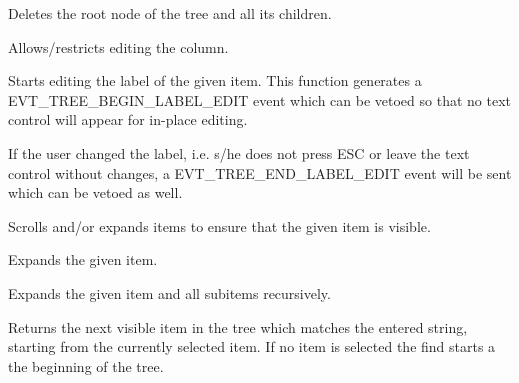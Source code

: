 
Deletes the root node of the tree and all its children.

\label{wxtreelistctrleditablecolumn}


Allows/restricts editing the column.

\label{wxtreelistctrleditlabel}


Starts editing the label of the given item. This function generates a
EVT\_TREE\_BEGIN\_LABEL\_EDIT event which can be vetoed so that no
text control will appear for in-place editing.

If the user changed the label, i.e. s/he does not press ESC or leave
the text control without changes, a EVT\_TREE\_END\_LABEL\_EDIT event
will be sent which can be vetoed as well.



\label{wxtreelistctrlensurevisible}


Scrolls and/or expands items to ensure that the given item is visible.

\label{wxtreelistctrlexpand}


Expands the given item.

\label{wxtreelistctrlexpandall}


Expands the given item and all subitems recursively.

\label{wxtreelistctrlfinditem}


Returns the next visible item in the tree which matches the entered string, starting from 
the currently selected item. If no item is selected the find starts a the beginning of the 
tree.

